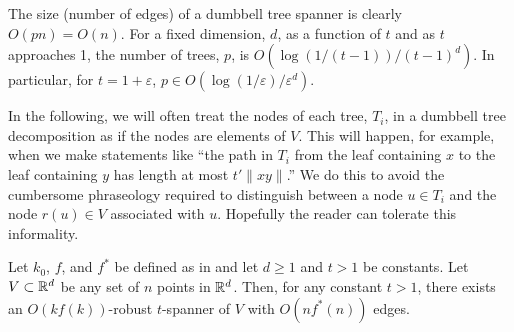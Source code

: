 \documentclass[final]{siamltex}
\newcommand{\eps}{\varepsilon}
\begin{document}
The size (number of edges) of a dumbbell tree spanner is clearly
$O(pn)=O(n)$.  For a fixed dimension, $d$, as a function of $t$ and as $t$
approaches 1, the number of trees, $p$, is $O(\log(1/(t-1))/(t-1)^d)$.
In particular, for $t=1+\eps$, $p\in O(\log(1/\eps)/\eps^d)$.


In the following, we will often treat the nodes of each tree, $T_i$,
in a dumbbell tree decomposition as if the nodes are elements of $V$.
This will happen, for example, when we make statements like ``the path in
$T_i$ from the leaf containing $x$ to the leaf containing $y$ has length
at most $t'\|xy\|$.''  We do this to avoid the cumbersome phraseology
required to distinguish between a node $u\in T_i$ and the node $r(u)\in V$
associated with $u$.  Hopefully the reader can tolerate this informality.

\begin{thm}
  Let $k_0$, $f$, and $f^*$ be defined as in  and let
  $d\ge 1$ and $t>1$ be constants.  Let $V\subset \mathbb{R}^d$ be any set of
  $n$ points in $\mathbb{R}^d$.  Then, for any constant $t>1$,  there exists an
  $O(kf(k))$-robust $t$-spanner of $V$ with $O(nf^*(n))$ edges.
\end{thm}
\end{document}

